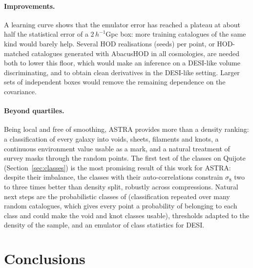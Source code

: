 \documentclass[11pt,twocolumn]{article}
\begin{document}
\paragraph{Improvements.} A learning curve shows that the emulator error has reached a plateau at about half the statistical error of a $2\,h^{-1}$Gpc box: more training catalogues of the same kind would barely help. Several HOD realisations (seeds) per point, or HOD-matched catalogues generated with AbacusHOD in all cosmologies, are needed both to lower this floor, which would make an inference on a DESI-like volume discriminating, and to obtain clean derivatives in the DESI-like setting. Larger sets of independent boxes would remove the remaining dependence on the covariance.

\paragraph{Beyond quartiles.} Being local and free of smoothing, ASTRA provides more than a density ranking: a classification of every galaxy into voids, sheets, filaments and knots, a continuous environment value usable as a mark, and a natural treatment of survey masks through the random points. The first test of the classes on Quijote (Section~\ref{sec:classes}) is the most promising result of this work for ASTRA: despite their imbalance, the classes with their auto-correlations constrain $\sigma_8$ two to three times better than density split, robustly across compressions. Natural next steps are the probabilistic classes of \cite{ASTRA} (classification repeated over many random catalogues, which gives every point a probability of belonging to each class and could make the void and knot classes usable), thresholds adapted to the density of the sample, and an emulator of class statistics for DESI.

\section{Conclusions}
\end{document}
